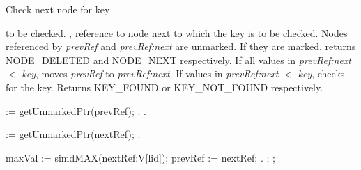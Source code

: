 \documentclass[11pt,onecolumn]{IEEEtran}
\begin{document}
\begin{algorithm}
  \caption{Check next node for key}
  \label{alg:check}
  \begin{algorithmic}[1]
    \Require
        to be checked.
       , reference to node next to which the key is to
               be checked.
    \Ensure
       \Statex Nodes referenced by {\it prevRef} and {\it prevRef:next} are
               unmarked. If they are marked, returns NODE\_DELETED and
               NODE\_NEXT respectively.
       \Statex If all values in {\it prevRef:next} $<$ {\it key}, moves
               {\it prevRef} to {\it prevRef:next}.          
       \Statex If values in {\it prevRef:next} $<$ {\it key}, checks for the key.
               Returns KEY\_FOUND or KEY\_NOT\_FOUND respectively.

    \Statex   
        := getUnmarkedPtr(prevRef);
         \State
         .
       \EndIf
         \State
         .
       \EndIf

        := getUnmarkedPtr(nextRef);
         \State
         .
       \EndIf
         
       \State maxVal := simdMAX(nextRef:V[lid]);
           \State prevRef := nextRef;
           .
       \Else
               \State
               ;
           \Else
               \State               
               ;   
           \EndIf   
         \EndIf
    \EndFunction
  \end{algorithmic}
\end{algorithm}
\end{document}
